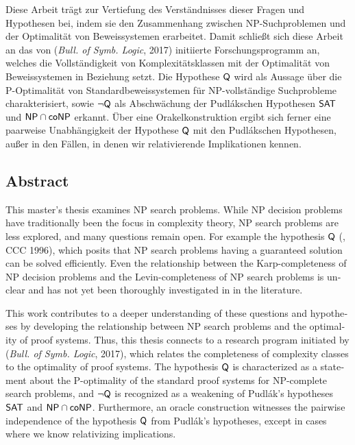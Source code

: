 Diese Arbeit trägt zur Vertiefung des Verständnisses dieser Fragen und Hypothesen bei, indem sie den Zusammenhang zwischen NP-Suchproblemen und der Optimalität von Beweissystemen erarbeitet. Damit schließt sich diese Arbeit an das von \citeauthor{pudlak_incompleteness_2017} (\emph{Bull. of Symb. Logic}, 2017) initiierte Forschungsprogramm an, welches die Vollständigkeit von Komplexitätsklassen mit der Optimalität von Beweissystemen in Beziehung setzt. Die Hypothese $\mathsf{Q}$ wird als Aussage über die P-Optimalität von Standardbeweissystemen für NP-vollständige Suchprobleme charakterisiert, sowie $\neg\mathsf{Q}$ als Abschwächung der Pudlákschen Hypothesen $\mathsf{SAT}$ und $\mathsf{NP}{}\cap{}\mathsf{coNP}$ erkannt.
Über eine Orakelkonstruktion ergibt sich ferner eine paarweise Unabhängigkeit der Hypothese $\mathsf{Q}$ mit den Pudlákschen Hypothesen, außer in den Fällen, in denen wir relativierende Implikationen kennen.

\begin{otherlanguage}{english}
\section*{Abstract}
This master's thesis examines NP search problems. While NP decision problems have traditionally been the focus in complexity theory, NP search problems are less explored, and many questions remain open.
For example the hypothesis $\mathsf{Q}$ (\citeauthor{fenner_inverting_1996}, CCC 1996), which posits that NP search problems having a guaranteed solution can be solved efficiently.
Even the relationship between the Karp-completeness of NP decision problems and the Levin-completeness of NP search problems is unclear and has not yet been thoroughly investigated in in the literature.

This work contributes to a deeper understanding of these questions and hypotheses by developing the relationship between NP search problems and the optimality of proof systems. Thus, this thesis connects to a research program initiated by \citeauthor{pudlak_incompleteness_2017} (\emph{Bull. of Symb. Logic}, 2017), which relates the completeness of complexity classes to the optimality of proof systems. The hypothesis $\mathsf{Q}$ is characterized as a statement about the P-optimality of the standard proof systems for NP-complete search problems, and $\neg\mathsf{Q}$ is recognized as a weakening of Pudlák's hypotheses $\mathsf{SAT}$ and $\mathsf{NP}{}\cap{}\mathsf{coNP}$.
Furthermore, an oracle construction witnesses the pairwise independence of the hypothesis $\mathsf{Q}$ from Pudlák's hypotheses, except in cases where we know relativizing implications.
\end{otherlanguage}
\cleardoublepage

\tableofcontents
\thispagestyle{empty}
\cleardoublepage
{}
\pagestyle{main}

